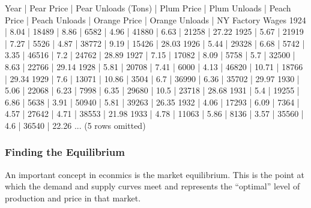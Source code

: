 \documentclass[letterpaper,10pt,english]{jupyterBook}
\begin{document}
\begin{sphinxVerbatim}[commandchars=\\\{\}]
  
\end{sphinxVerbatim}

\begin{sphinxVerbatim}[commandchars=\\\{\}]
Year | Pear Price | Pear Unloads (Tons) | Plum Price | Plum Unloads | Peach Price | Peach Unloads | Orange Price | Orange Unloads | NY Factory Wages
1924 | 8.04       | 18489               | 8.86       | 6582         | 4.96        | 41880         | 6.63         | 21258          | 27.22
1925 | 5.67       | 21919               | 7.27       | 5526         | 4.87        | 38772         | 9.19         | 15426          | 28.03
1926 | 5.44       | 29328               | 6.68       | 5742         | 3.35        | 46516         | 7.2          | 24762          | 28.89
1927 | 7.15       | 17082               | 8.09       | 5758         | 5.7         | 32500         | 8.63         | 22766          | 29.14
1928 | 5.81       | 20708               | 7.41       | 6000         | 4.13        | 46820         | 10.71        | 18766          | 29.34
1929 | 7.6        | 13071               | 10.86      | 3504         | 6.7         | 36990         | 6.36         | 35702          | 29.97
1930 | 5.06       | 22068               | 6.23       | 7998         | 6.35        | 29680         | 10.5         | 23718          | 28.68
1931 | 5.4        | 19255               | 6.86       | 5638         | 3.91        | 50940         | 5.81         | 39263          | 26.35
1932 | 4.06       | 17293               | 6.09       | 7364         | 4.57        | 27642         | 4.71         | 38553          | 21.98
1933 | 4.78       | 11063               | 5.86       | 8136         | 3.57        | 35560         | 4.6          | 36540          | 22.26
... (5 rows omitted)
\end{sphinxVerbatim}


\subsubsection{Finding the Equilibrium}
\label{\detokenize{content/02-supply/03-market-equilibria:finding-the-equilibrium}}
\sphinxAtStartPar
An important concept in econmics is the market equilibrium. This is the point at which the demand and supply curves meet and represents the “optimal” level of production and price in that market.
\end{document}
